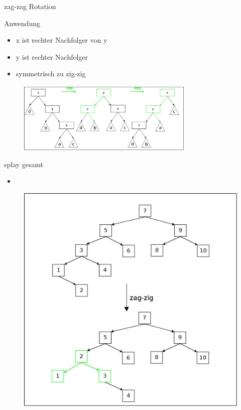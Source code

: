 \documentclass[11pt]{beamer}
\begin{document}
	
	\begin{frame}{zag-zag  Rotation}
		\begin{block}{Anwendung}
			\begin{itemize}
				\item x ist rechter Nachfolger von y
				\item y ist rechter Nachfolger
				\item symmetrisch zu zig-zig
			\end{itemize}
		\end{block}
		\pause
		\begin{figure}[h]
			\centering
			\includegraphics[width=0.75\textwidth]{"bilder/zagzagRotation"}
		\end{figure}
	\end{frame}	

		\begin{frame}{splay gesamt}
			
			\begin{itemize}
				\item  {}
			\end{itemize}
		\pause
		\begin{figure}[h]
			\centering
			\includegraphics[height=0.5\textwidth]{"bilder/splayGesamt1"}
		\end{figure}
		
	\end{frame}
\end{document}
